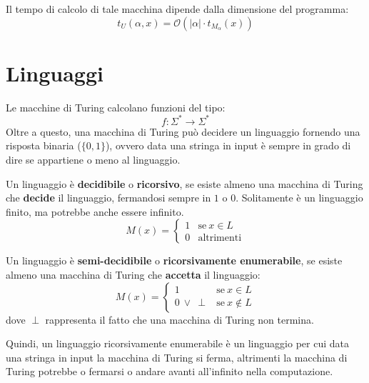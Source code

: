 Il tempo di calcolo di tale macchina dipende dalla dimensione del programma:
\begin{equation}
    t_U(\alpha, x) = \mathcal{O}(|\alpha| \cdot t_{M_{\alpha}}(x))
\end{equation}
\section{Linguaggi}
Le macchine di Turing calcolano funzioni del tipo:
\begin{equation}
    f: \Sigma^{\ast} \to \Sigma^{\ast}
\end{equation}
Oltre a questo, una macchina di Turing può decidere un linguaggio fornendo una
risposta binaria ($\{0, 1\}$), ovvero data una stringa in input è sempre in grado
di dire se appartiene o meno al linguaggio.
\begin{definizione} 
    Un linguaggio è \textbf{decidibile} o \textbf{ricorsivo}, se esiste almeno
    una macchina di Turing che \textbf{decide} il linguaggio, fermandosi sempre
    in $1$ o $0$. Solitamente è un linguaggio finito, ma potrebbe anche essere infinito.
    \begin{equation}
        M(x) = \begin{cases}
            1 & \text{se} \ x \in L \\
            0 & \text{altrimenti}
        \end{cases}
    \end{equation}
\end{definizione}
\begin{definizione} 
    Un linguaggio è \textbf{semi-decidibile} o \textbf{ricorsivamente enumerabile},
    se esiste almeno una macchina di Turing che \textbf{accetta} il linguaggio:
    \begin{equation}
        M(x) = \begin{cases}
            1                & \text{se} \ x \in L    \\
            0 \ \lor \ \perp & \text{se} \ x \notin L
        \end{cases}
    \end{equation}
    dove $\perp$ rappresenta il fatto che una macchina di Turing non termina.

    Quindi, un linguaggio ricorsivamente enumerabile è un linguaggio per cui data
    una stringa in input la macchina di Turing si ferma, altrimenti la macchina
    di Turing potrebbe o fermarsi o andare avanti all'infinito nella computazione.
\end{definizione}
